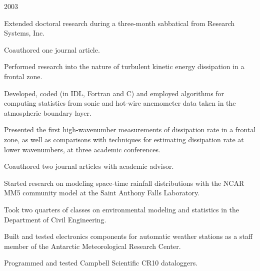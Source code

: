  {2003}
\begin{compactitem}[\itembullet]
  \item Extended doctoral research during a three-month sabbatical
    from Research Systems, Inc.
  \item Coauthored one journal article.
\end{compactitem}

\begin{compactitem}[\itembullet]
  \item Performed research into the nature of turbulent kinetic energy
    dissipation in a frontal zone.
  \item Developed, coded (in IDL, Fortran and C) and employed
    algorithms for computing statistics from sonic and hot-wire
    anemometer data taken in the atmospheric boundary layer.
  \item Presented the first high-wavenumber measurements of
    dissipation rate in a frontal zone, as well as comparisons with
    techniques for estimating dissipation rate at lower wavenumbers,
    at three academic conferences.
  \item Coauthored two journal articles with academic advisor.
\end{compactitem}

\begin{compactitem}[\itembullet]
  \item Started research on modeling space-time rainfall distributions
    with the NCAR MM5 community model at the Saint Anthony Falls
    Laboratory.
  \item Took two quarters of classes on environmental modeling and
    statistics in the Department of Civil Engineering.
\end{compactitem}

\begin{compactitem}[\itembullet]
  \item Built and tested electronics components for automatic weather
    stations as a staff member of the Antarctic Meteorological
    Research Center.
  \item Programmed and tested Campbell Scientific CR10 dataloggers.
\end{compactitem}

